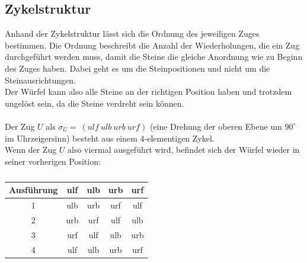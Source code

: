 \documentclass[12pt,a4paper, usenames, dvipsnames]{article}
\begin{document}
\newpage


\subsection*{Zykelstruktur}


Anhand der Zykelstruktur lässt sich die Ordnung des jeweiligen Zuges bestimmen. Die Ordnung beschreibt die Anzahl der Wiederholungen, die ein Zug durchgeführt werden muss, damit die Steine die gleiche Anordnung wie zu Beginn des Zuges haben. Dabei geht es um die Steinpositionen und nicht um die Steinausrichtungen.\\
Der Würfel kann also alle Steine an der richtigen Position haben und trotzdem ungelöst sein, da die Steine verdreht sein können. \\
\\
Der Zug $U$ als $\sigma_U =\ (ulf \ ulb \ urb \ urf) $ (eine Drehung der oberen Ebene um $90^\circ$ im Uhrzeigersinn) besteht aus einem 4-elementigen Zykel. \\
Wenn der Zug $U$ also viermal ausgeführt wird, befindet sich der Würfel wieder in seiner vorherigen Position: 

\begin{table}[H]
\centering
\begin{tabular}{|c||c|c|c|c|}
\hline
Ausführung & ulf & ulb & urb & urf \\
\hline
\hline
1 & ulb & urb & urf & ulf \\
\hline
2 & urb & urf & ulf & ulb \\
\hline
3 & urf & ulf & ulb & urb \\
\hline
4 & ulf & ulb & urb & urf \\
\hline

\end{tabular}
\caption[Permutationen des Zuges $U$]{}
\end{table}
\end{document}
